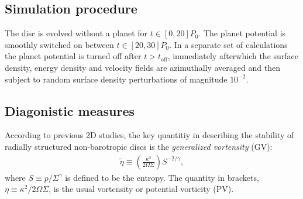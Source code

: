 
\subsection{Simulation procedure}
The disc is evolved without a planet for $t\in[0,20]P_0$. The planet potential is smoothly switched on
between $t\in[20,30]P_0$. In a separate set of calculations the planet
potential is turned off after $t>t_\mathrm{off}$, immediately  
afterwhich the surface density, energy density and velocity fields are
azimuthally averaged and then subject to random surface density  
perturbations of magnitude $10^{-2}$.   


\subsection{Diagonistic measures}

According to previous 2D studies, the key quantitiy in describing the
stability of radially structured non-barotropic discs is the
\emph{generalized vortensity} (GV): 
\begin{align}
  \tilde{\eta}\equiv \left(\frac{\kappa^2}{2\Omega\Sigma}\right)S^{-2/\gamma}, 
\end{align}
where $S \equiv p/\Sigma^\gamma$ is defined to be the entropy. The
quantity in brackets, $\eta\equiv \kappa^2/2\Omega\Sigma$, is the
usual vortensity or potential vorticity (PV). 

